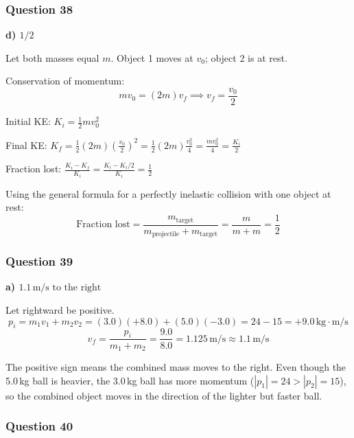 \documentclass[12pt,letterpaper]{article}
\begin{document}
\subsubsection*{Question 38}

\begin{answerbox}
\textbf{d) $1/2$}
\end{answerbox}

\begin{explanationbox}
Let both masses equal $m$. Object 1 moves at $v_0$; object 2 is at rest.

Conservation of momentum:
\[
mv_0 = (2m)v_f \implies v_f = \frac{v_0}{2}
\]

Initial KE: $K_i = \frac{1}{2}mv_0^2$

Final KE: $K_f = \frac{1}{2}(2m)\left(\frac{v_0}{2}\right)^2 = \frac{1}{2}(2m)\frac{v_0^2}{4} = \frac{mv_0^2}{4} = \frac{K_i}{2}$

Fraction lost: $\displaystyle\frac{K_i - K_f}{K_i} = \frac{K_i - K_i/2}{K_i} = \frac{1}{2}$

Using the general formula for a perfectly inelastic collision with one object at rest:
\[
\text{Fraction lost} = \frac{m_{\text{target}}}{m_{\text{projectile}} + m_{\text{target}}} = \frac{m}{m + m} = \frac{1}{2}
\]
\end{explanationbox}

\subsubsection*{Question 39}

\begin{answerbox}
\textbf{a) $1.1\,\text{m/s to the right}$}
\end{answerbox}

\begin{explanationbox}
Let rightward be positive.
\[
p_i = m_1 v_1 + m_2 v_2 = (3.0)(+8.0) + (5.0)(-3.0) = 24 - 15 = +9.0\,\text{kg}\cdot\text{m/s}
\]
\[
v_f = \frac{p_i}{m_1 + m_2} = \frac{9.0}{8.0} = 1.125\,\text{m/s} \approx 1.1\,\text{m/s}
\]

The positive sign means the combined mass moves to the right. Even though the 5.0\,kg ball is heavier, the 3.0\,kg ball has more momentum ($|p_1| = 24 > |p_2| = 15$), so the combined object moves in the direction of the lighter but faster ball.
\end{explanationbox}

\subsubsection*{Question 40}
\end{document}
